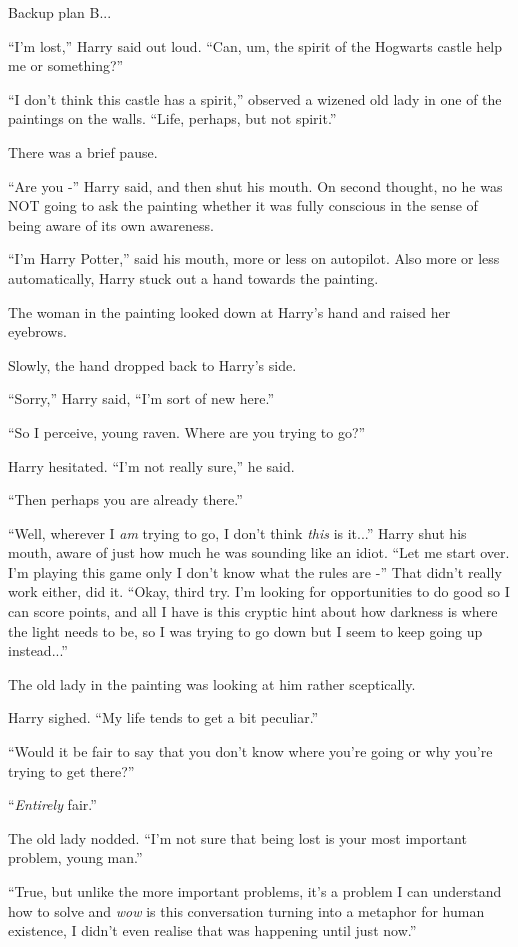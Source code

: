 Backup plan B...

``I'm lost,'' Harry said out loud. ``Can, um, the spirit of the Hogwarts
castle help me or something?''

``I don't think this castle has a spirit,'' observed a wizened old lady
in one of the paintings on the walls. ``Life, perhaps, but not spirit.''

There was a brief pause.

``Are you -'' Harry said, and then shut his mouth. On second thought, no
he was NOT going to ask the painting whether it was fully conscious in
the sense of being aware of its own awareness.

``I'm Harry Potter,'' said his mouth, more or less on autopilot. Also
more or less automatically, Harry stuck out a hand towards the painting.

The woman in the painting looked down at Harry's hand and raised her
eyebrows.

Slowly, the hand dropped back to Harry's side.

``Sorry,'' Harry said, ``I'm sort of new here.''

``So I perceive, young raven. Where are you trying to go?''

Harry hesitated. ``I'm not really sure,'' he said.

``Then perhaps you are already there.''

``Well, wherever I \emph{am} trying to go, I don't think \emph{this} is
it...'' Harry shut his mouth, aware of just how much he was
sounding like an idiot. ``Let me start over. I'm playing this game only
I don't know what the rules are -'' That didn't really work either, did
it. ``Okay, third try. I'm looking for opportunities to do good so I can
score points, and all I have is this cryptic hint about how darkness is
where the light needs to be, so I was trying to go down but I seem to
keep going up instead...''

The old lady in the painting was looking at him rather sceptically.

Harry sighed. ``My life tends to get a bit peculiar.''

``Would it be fair to say that you don't know where you're going or why
you're trying to get there?''

``\emph{Entirely} fair.''

The old lady nodded. ``I'm not sure that being lost is your most
important problem, young man.''

``True, but unlike the more important problems, it's a problem I can
understand how to solve and \emph{wow} is this conversation turning into
a metaphor for human existence, I didn't even realise that was happening
until just now.''

